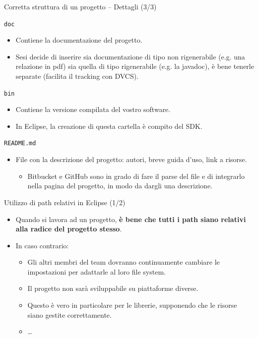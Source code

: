 \documentclass[presentation]{beamer}
\begin{document}
\begin{frame}{Corretta struttura di un progetto -- Dettagli (3/3)}
\begin{block}{\texttt{doc}}
\begin{itemize}
\item Contiene la documentazione del progetto.
\item Sesi decide di inserire sia documentazione di tipo non rigenerabile (e.g. una relazione in pdf) sia quella di tipo rigenerabile (e.g. la javadoc), è bene tenerle separate (facilita il tracking con DVCS).
\end{itemize}
\end{block}

\begin{block}{\texttt{bin}}
\begin{itemize}
\item Contiene la versione compilata del vostro software.
\item In Eclipse, la creazione di questa cartella è compito del SDK.
\end{itemize}
\end{block}

\begin{block}{\texttt{README.md}}
\begin{itemize}
\item File con la descrizione del progetto: autori, breve guida d'uso, link a risorse. \begin{itemize}
\item Bitbucket e GitHub sono in grado di fare il parse del file e di integrarlo nella pagina del progetto, in modo da dargli una descrizione.
\end{itemize} 
\end{itemize}
\end{block}

\end{frame}

\begin{frame}{Utilizzo di path relativi in Eclipse (1/2)}
\begin{itemize}\itemsep20pt
\item Quando si lavora ad un progetto, \textbf{è bene che tutti i path siano relativi alla radice del progetto stesso}.
\item In caso contrario:
\begin{itemize}
\item Gli altri membri del team dovranno continuamente cambiare le impostazioni per adattarle al loro file system.
\item Il progetto non sarà sviluppabile su piattaforme diverse.
\item Questo è vero in particolare per le librerie, supponendo che le risorse siano gestite correttamente.
\item \dots
\end{itemize}
\end{itemize}
\end{frame}
\end{document}
